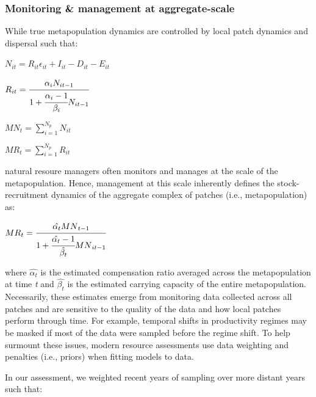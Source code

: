 \documentclass[]{article}
\begin{document}
\subsubsection{Monitoring \& management at
aggregate-scale}\label{monitoring-management-at-aggregate-scale}

While true metapopulation dynamics are controlled by local patch
dynamics and dispersal such that:

\(N_{it}= R_{it}\epsilon_{it}+I_{it}-D_{it}-E_{it}\)

\(R_{it}=\cfrac{\alpha_iN_{it-1}}{1+\cfrac{\alpha_i-1}{\beta_i}N_{it-1}}\)

\({MN}_t = \sum_{i=1}^{N_p} N_{it}\)

\({MR}_t = \sum_{i=1}^{N_p} R_{it}\)

natural resoure managers often monitors and manages at the scale of the
metapopulation. Hence, management at this scale inherently defines the
stock-recruitment dynamics of the aggregate complex of patches (i.e.,
metapopulation) as:

\({MR}_{t}=\cfrac{\hat{\alpha_t}{MN}_{t-1}}{1+\cfrac{\hat{\alpha_t}-1}{\hat{\beta_t}}{MN}_{it-1}}\)

where \(\hat{\alpha_t}\) is the estimated compensation ratio averaged
across the metapopulation at time \emph{t} and \(\hat{\beta_t}\) is the
estimated carrying capacity of the entire metapopulation. Necessarily,
these estimates emerge from monitoring data collected across all patches
and are sensitive to the quality of the data and how local patches
perform through time. For example, temporal shifts in productivity
regimes may be masked if most of the data were sampled before the regime
shift. To help surmount these issues, modern resource assessments use
data weighting and penalties (i.e., priors) when fitting models to data.

In our assessment, we weighted recent years of sampling over more
distant years such that:
\end{document}
